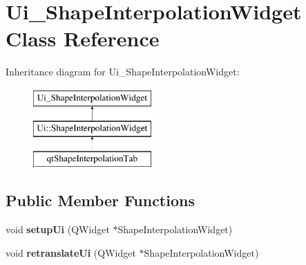 \hypertarget{class_ui___shape_interpolation_widget}{}\section{Ui\+\_\+\+Shape\+Interpolation\+Widget Class Reference}
\label{class_ui___shape_interpolation_widget}
Inheritance diagram for Ui\+\_\+\+Shape\+Interpolation\+Widget\+:\begin{figure}[H]
\begin{center}
\leavevmode
\includegraphics[height=3.000000cm]{class_ui___shape_interpolation_widget}
\end{center}
\end{figure}
\subsection*{Public Member Functions}
\begin{DoxyCompactItemize}
\item 
\hypertarget{class_ui___shape_interpolation_widget_a88f5cc16b1c306cf5e32067805e97ce0}{}void {\bfseries setup\+Ui} (Q\+Widget $\ast$Shape\+Interpolation\+Widget)\label{class_ui___shape_interpolation_widget_a88f5cc16b1c306cf5e32067805e97ce0}

\item 
\hypertarget{class_ui___shape_interpolation_widget_a0207b3587f39c1ece8c00096b2e8b458}{}void {\bfseries retranslate\+Ui} (Q\+Widget $\ast$Shape\+Interpolation\+Widget)\label{class_ui___shape_interpolation_widget_a0207b3587f39c1ece8c00096b2e8b458}

\end{DoxyCompactItemize}
